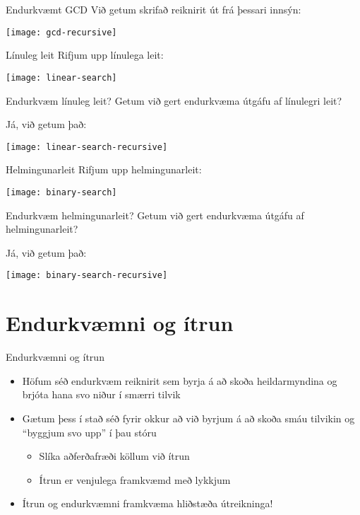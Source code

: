 \documentclass{beamer}
\begin{document}
\begin{frame}{Endurkvæmt GCD}
Við getum skrifað reiknirit út frá þessari innsýn:
\begin{center}
\texttt{[image: gcd-recursive]}
\end{center}
\end{frame}

\begin{frame}{Línuleg leit}
Rifjum upp línulega leit:
\begin{center}
\texttt{[image: linear-search]}
\end{center}
\end{frame}

\begin{frame}{Endurkvæm línuleg leit?}
Getum við gert endurkvæma útgáfu af línulegri leit?\pause

Já, við getum það:
\begin{center}
\texttt{[image: linear-search-recursive]}
\end{center}
\end{frame}

\begin{frame}{Helmingunarleit}
Rifjum upp helmingunarleit:
\begin{center}
\texttt{[image: binary-search]}
\end{center}
\end{frame}

\begin{frame}{Endurkvæm helmingunarleit?}
Getum við gert endurkvæma útgáfu af helmingunarleit?\pause

Já, við getum það:
\begin{center}
\texttt{[image: binary-search-recursive]}
\end{center}
\end{frame}

\section{Endurkvæmni og ítrun}

\begin{frame}{Endurkvæmni og ítrun}
\begin{itemize}
 \item Höfum séð endurkvæm reiknirit sem byrja á að skoða heildarmyndina og brjóta hana svo niður í smærri tilvik
 \item Gætum þess í stað séð fyrir okkur að við byrjum á að skoða smáu tilvikin og ``byggjum svo upp'' í þau stóru
 \begin{itemize}
  \item Slíka aðferðafræði köllum við ítrun
  \item Ítrun er venjulega framkvæmd með lykkjum
 \end{itemize}
 \item Ítrun og endurkvæmni framkvæma hliðstæða útreikninga!
\end{itemize}
\end{frame}
\end{document}
